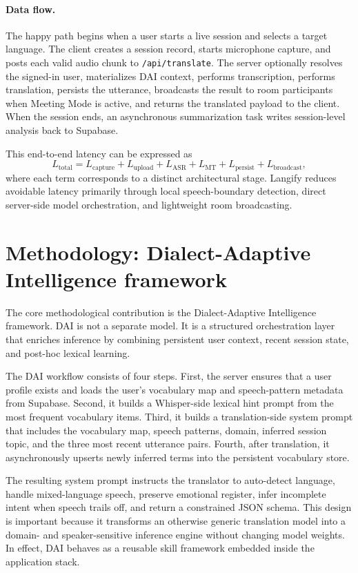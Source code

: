 \documentclass[twocolumn]{svjour3}
\begin{document}
\paragraph{Data flow.} The happy path begins when a user starts a live session and selects a target language. The client creates a session record, starts microphone capture, and posts each valid audio chunk to \mbox{\texttt{/api/translate}}. The server optionally resolves the signed-in user, materializes DAI context, performs transcription, performs translation, persists the utterance, broadcasts the result to room participants when Meeting Mode is active, and returns the translated payload to the client. When the session ends, an asynchronous summarization task writes session-level analysis back to Supabase.

This end-to-end latency can be expressed as
\begin{equation}
L_{\mathrm{total}} = L_{\mathrm{capture}} + L_{\mathrm{upload}} + L_{\mathrm{ASR}} + L_{\mathrm{MT}} + L_{\mathrm{persist}} + L_{\mathrm{broadcast}},
\end{equation}
where each term corresponds to a distinct architectural stage. Langify reduces avoidable latency primarily through local speech-boundary detection, direct server-side model orchestration, and lightweight room broadcasting.

\section{Methodology: Dialect-Adaptive Intelligence framework}
\label{sec:method}
The core methodological contribution is the Dialect-Adaptive Intelligence framework. DAI is not a separate model. It is a structured orchestration layer that enriches inference by combining persistent user context, recent session state, and post-hoc lexical learning.

The DAI workflow consists of four steps. First, the server ensures that a user profile exists and loads the user's vocabulary map and speech-pattern metadata from Supabase. Second, it builds a Whisper-side lexical hint prompt from the most frequent vocabulary items. Third, it builds a translation-side system prompt that includes the vocabulary map, speech patterns, domain, inferred session topic, and the three most recent utterance pairs. Fourth, after translation, it asynchronously upserts newly inferred terms into the persistent vocabulary store.

The resulting system prompt instructs the translator to auto-detect language, handle mixed-language speech, preserve emotional register, infer incomplete intent when speech trails off, and return a constrained JSON schema. This design is important because it transforms an otherwise generic translation model into a domain- and speaker-sensitive inference engine without changing model weights. In effect, DAI behaves as a reusable skill framework embedded inside the application stack.
\end{document}
